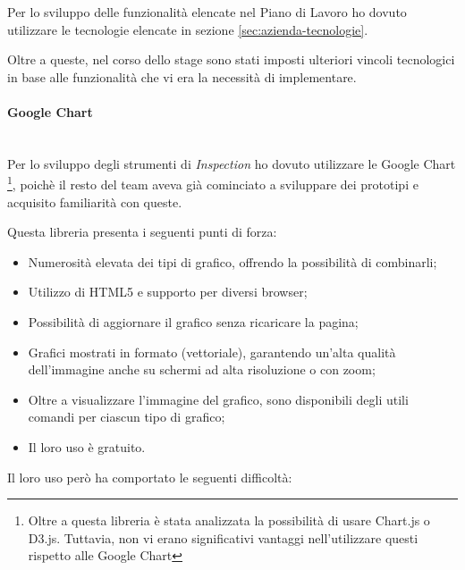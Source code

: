 Per lo sviluppo delle funzionalità elencate nel Piano di Lavoro ho dovuto
utilizzare le tecnologie elencate in sezione \ref{sec:azienda-tecnologie}.

Oltre a queste, nel corso dello stage sono stati imposti ulteriori vincoli
tecnologici in base alle funzionalità che vi era la necessità di implementare.

\paragraph{Google Chart} \mbox{} \\

Per lo sviluppo degli strumenti di \emph{Inspection} ho dovuto utilizzare le
Google Chart \footnote{Oltre a questa libreria è stata analizzata
la possibilità di usare Chart.js o D3.js. Tuttavia, non vi erano significativi
vantaggi nell'utilizzare questi rispetto alle Google Chart },
poichè il resto del team aveva già cominciato a sviluppare dei prototipi e
acquisito familiarità con queste.

Questa libreria presenta i seguenti punti di forza:

\begin{itemize}
\item Numerosità elevata dei tipi di grafico, offrendo la possibilità di
  combinarli;
\item Utilizzo di HTML5 e supporto per diversi browser;
\item Possibilità di aggiornare il grafico senza ricaricare la pagina;
\item Grafici mostrati in formato  (vettoriale), garantendo un'alta qualità
  dell'immagine anche su schermi ad alta risoluzione o con zoom;
\item Oltre a visualizzare l'immagine del grafico, sono disponibili degli
  utili comandi per ciascun tipo di grafico;
\item Il loro uso è gratuito.
\end{itemize}

Il loro uso però ha comportato le seguenti difficoltà:

